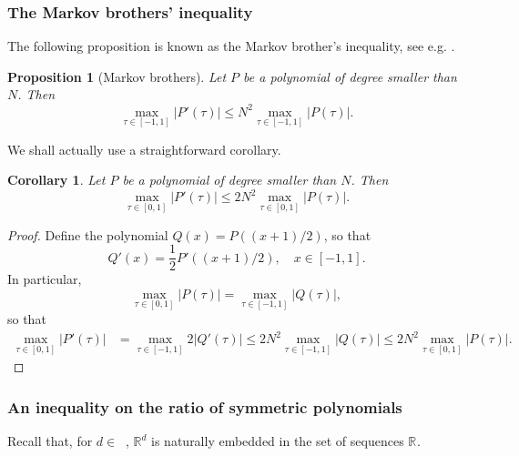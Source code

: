 \documentclass[twoside,11pt]{book}
\newtheorem{corollary}{Corollary}
\newtheorem{proposition}{Proposition}
\numberwithin{theorem}{chapter}
\numberwithin{definition}{chapter}
\numberwithin{proposition}{chapter}
\numberwithin{corollary}{chapter}
\numberwithin{example}{chapter}
\numberwithin{lemma}{chapter}
\numberwithin{assumption}{chapter}
\numberwithin{equation}{chapter}
\numberwithin{figure}{chapter}
\DeclareMathOperator{\Ns}{\mathbb{N}^{*}}
\begin{document}
\subsubsection{The Markov brothers' inequality}
The following proposition is known as the Markov brother's inequality, see e.g. \parencite{Sha04}.
\begin{proposition}[Markov brothers]\label{CVS_thm:Markov_Brothers_inequality}
Let $P$ be a polynomial of degree smaller than $N$. Then
\begin{equation}
\max_{\tau \in [-1,1]} |P'(\tau)| \leq N^{2}\max_{\tau \in [-1,1]}|P(\tau)|.
\end{equation}
\end{proposition}
We shall actually use a straightforward corollary.
\begin{corollary}\label{CVS_cor:Markov_Brothers_inequality_2}
Let $P$ be a polynomial of degree smaller than $N$. Then
\begin{equation}
\max_{\tau \in [0,1]} |P'(\tau)| \leq 2N^{2}\max_{\tau \in [0,1]}|P(\tau)|.
\end{equation}
\end{corollary}
\begin{proof}
Define the polynomial $Q(x) = P((x+1)/2)$, so that
\begin{equation}
Q'(x) = \frac{1}{2}P'((x+1)/2), \quad x\in[-1,1].
\end{equation}
In particular,
$$\max_{\tau \in [0,1]} |P(\tau)| = \max_{\tau \in [-1,1]} |Q(\tau)|,$$
so that
%
\begin{align}
\max_{\tau \in [0,1]} |P'(\tau)| & = \max_{\tau \in [-1,1]} 2|Q'(\tau)| \leq 2N^2\max_{\tau \in [-1,1]} |Q(\tau)| \leq 2N^2\max_{\tau \in [0,1]} |P(\tau)|.
\end{align}
\end{proof}
\subsubsection{An inequality on the ratio of symmetric polynomials}
\label{CVS_s:inequality_symmetric_polys}
Recall that, for $d \in \Ns$, $\mathbb{R}^{d}$ is naturally embedded in the set of sequences $\mathbb{R}^{\Ns}$.
\end{document}
